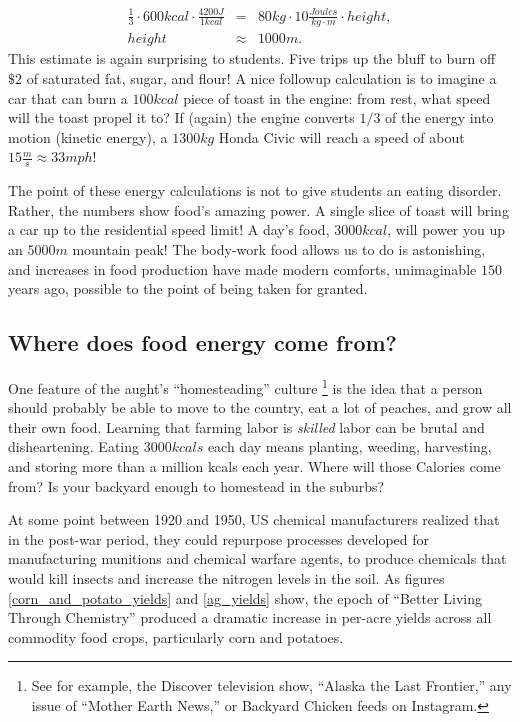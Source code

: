 \documentclass[jou]{apa7}
\newcommand{\bea}{\begin{eqnarray}}
\newcommand{\eea}{\end{eqnarray}}
\begin{document}
\bea
\frac{1}{3}\cdot600kcal\cdot\frac{4200J}{1kcal} 
	&=& 80kg\cdot10\frac{Joules}{kg\cdot m}\cdot height , \label{eq:bar_chart}\\
height &\approx&  1000 m .
\eea
This estimate is again surprising to students.  Five trips up the bluff to burn off $\$2$ of saturated fat, sugar, and flour!  A nice followup calculation is to imagine a car that can burn a $100kcal$ piece of toast in the engine: from rest, what speed will the toast propel it to? If (again) the engine converts $1/3$ of the energy into motion (kinetic energy), a $1300kg$ Honda Civic will reach a speed of about $15\frac{m}{s}\approx33mph$!  

The point of these energy calculations is not to give students an eating disorder.  Rather, the numbers show food's amazing power. A single slice of toast will bring a car up to the residential speed limit!  A day's food, $3000kcal$, will power you up an $5000m$ mountain peak! The body-work food allows us to do is astonishing, and increases in food production have made modern  comforts, unimaginable $150$ years ago, possible to the point of being taken for granted.  


\subsection{Where does food energy come from?}
One feature of the aught's ``homesteading'' culture
\footnote{See for example, the Discover television show, ``Alaska the Last Frontier,'' any issue of ``Mother Earth News,'' or Backyard Chicken feeds on Instagram.  }
is the idea that a person should probably be able to move to the country, eat a lot of peaches, and grow all their own food.  Learning that farming labor is \textit{skilled} labor can be brutal and disheartening. Eating $3000kcals$ each day means planting, weeding, harvesting, and storing more than a million kcals each year.\cite{Haspel}  
Where will those Calories come from? Is your backyard enough to homestead in the suburbs?\cite{backyard_homestead}

At some point between 1920 and 1950, US chemical manufacturers realized that in the post-war period, they could repurpose processes developed for manufacturing munitions and chemical warfare agents, to produce chemicals that would kill insects and increase the nitrogen levels in the soil. 
As figures \ref{corn_and_potato_yields} and \ref{ag_yields} show, the epoch of ``Better Living Through Chemistry'' produced a dramatic increase in per-acre yields across all commodity food crops, particularly corn and potatoes.  
\end{document}
